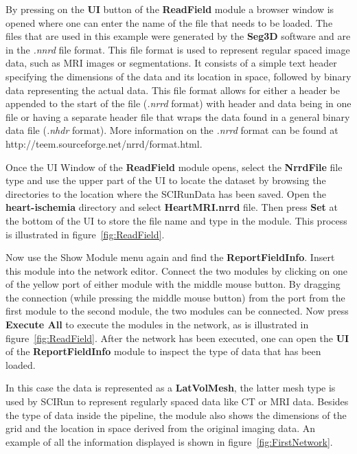\documentclass[fleqn,11pt,openany]{book}
\begin{document}
By pressing on the {\bf UI} button of the {\bf ReadField} module a browser window is opened where one can enter the name of the file that needs to be loaded. The files that are used in this example were generated by the {\bf Seg3D} software and are in the {\it .nnrd} file format. This file format is used to represent regular spaced image data, such as MRI images or segmentations. It consists of a simple text header specifying the dimensions of the data and its location in space, followed by binary data representing the actual data. This file format allows for either a header be appended to the start of the file ({\it .nrrd} format) with header and data being in one file or having a separate header file that wraps the data found in a general binary data file ({\it .nhdr} format). More information on the {\it .nrrd} format can be found at {http://teem.sourceforge.net/nrrd/format.html}.

Once the UI Window of the {\bf ReadField} module opens, select the {\bf NrrdFile} file type and use the upper part of the UI to locate the dataset by browsing the directories to the location where the SCIRunData has been saved. Open the {\bf heart-ischemia} directory and select  {\bf HeartMRI.nrrd} file. Then press {\bf Set} at the bottom of the UI to store the file name and type in the module. This process is illustrated in figure~\ref{fig:ReadField}.

Now use the Show Module menu again and find the {\bf ReportFieldInfo}. Insert this module into the network editor. Connect the two modules by clicking on one of the yellow port of either module with the middle mouse button. By dragging the connection (while pressing the middle mouse button) from the port from the first module to the second module, the two modules can be connected. Now press {\bf Execute All} to execute the modules in the network, as is illustrated in figure~\ref{fig:ReadField}. After the network has been executed, one can open the {\bf UI} of the {\bf ReportFieldInfo} module to inspect the type of data that has been loaded.

In this case the data is represented as a {\bf LatVolMesh}, the latter mesh type is used by SCIRun to represent regularly spaced data like CT or MRI data. Besides the type of data inside the pipeline, the module also shows the dimensions of the grid and the location in space derived from the original imaging data. An example of all the information displayed is shown in figure~\ref{fig:FirstNetwork}.
 
\end{document}
